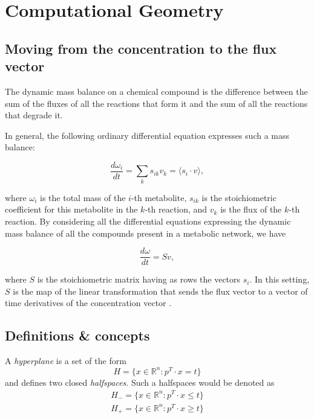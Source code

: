 \chapter{Computational Geometry}
\label{app:comp_geom_intro}

\section{Moving from the concentration to the flux vector}
\label{}


The dynamic mass balance on a chemical compound
is the difference between the sum of the  fluxes of all the reactions that form it
and the sum of all the reactions that degrade it.

In general, the following ordinary differential equation expresses such a mass balance:

\begin{equation}
\frac{d\omega_i}{dt} = \sum_{k} s_{ik} v_{k} = \langle {s_i} \cdot v \rangle ,
\end{equation}

where $\omega_i$ is the total mass of the $i$-th metabolite, $s_{ik}$ is the stoichiometric coefficient for this metabolite in the $k$-th
reaction, and $v_k$ is the flux of the $k$-th reaction. By
considering all the differential equations expressing the dynamic mass balance
of all the compounds present in a metabolic network, we have

\begin{equation}
\frac{d\omega}{dt} = S v ,
\end{equation}

where $S$ is the stoichiometric matrix
having as rows the  vectors $s_i$.
In this setting, $S$ is the map of the linear  transformation
that sends the flux vector to a vector of time derivatives of the concentration vector
\cite{palsson2015systems}.




\section{Definitions \& concepts}
\label{}

   A \textit{hyperplane} is a set of the form
   \begin{equation}
      H = \{x \in \mathbb{R}^n : p^{T} \cdot x = t \}      
   \end{equation}
   and defines two closed \textit{halfspaces}.
   Such a halfspaces would be denoted as
   \begin{equation}
      \begin{split}
         H_{-} = \{ x \in \mathbb{R}^n : p^{T} \cdot x \leq t \} \\
         H_{+} = \{ x \in \mathbb{R}^n : p^{T} \cdot x \geq t \}               
      \end{split}
   \end{equation}

